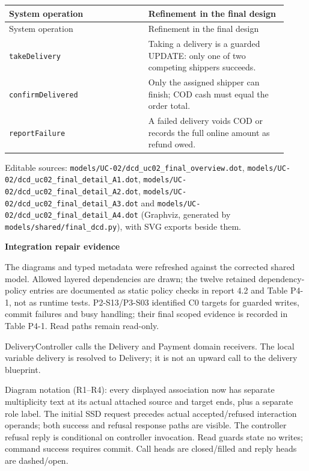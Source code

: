 \begin{longtable}{>{\raggedright\arraybackslash}p{0.4600\linewidth}>{\raggedright\arraybackslash}p{0.4600\linewidth}}
System operation & Refinement in the final design \\
\hline\endfirsthead
System operation & Refinement in the final design \\
\hline\endhead
\texttt{takeDelivery} & Taking a delivery is a guarded UPDATE: only one of two competing shippers succeeds. \\
\texttt{confirmDelivered} & Only the assigned shipper can finish; COD cash must equal the order total. \\
\texttt{reportFailure} & A failed delivery voids COD or records the full online amount as refund owed. \\
\end{longtable}
Editable sources: \texttt{models/\allowbreak{}UC-02/\allowbreak{}dcd\_\allowbreak{}uc02\_\allowbreak{}final\_\allowbreak{}overview.\allowbreak{}dot}, \texttt{models/\allowbreak{}UC-02/\allowbreak{}dcd\_\allowbreak{}uc02\_\allowbreak{}final\_\allowbreak{}detail\_\allowbreak{}A1.\allowbreak{}dot}, \texttt{models/\allowbreak{}UC-02/\allowbreak{}dcd\_\allowbreak{}uc02\_\allowbreak{}final\_\allowbreak{}detail\_\allowbreak{}A2.\allowbreak{}dot}, \texttt{models/\allowbreak{}UC-02/\allowbreak{}dcd\_\allowbreak{}uc02\_\allowbreak{}final\_\allowbreak{}detail\_\allowbreak{}A3.\allowbreak{}dot} and \texttt{models/\allowbreak{}UC-02/\allowbreak{}dcd\_\allowbreak{}uc02\_\allowbreak{}final\_\allowbreak{}detail\_\allowbreak{}A4.\allowbreak{}dot} (Graphviz, generated by \texttt{models/\allowbreak{}shared/\allowbreak{}final\_\allowbreak{}dcd.\allowbreak{}py}), with SVG exports beside them.

\textbf{Integration repair evidence}

The diagrams and typed metadata were refreshed against the corrected shared model. Allowed layered dependencies are drawn; the twelve retained dependency-policy entries are documented as static policy checks in report 4.2 and Table P4-1, not as runtime tests. P2-S13/P3-S03 identified C0 targets for guarded writes, commit failures and busy handling; their final scoped evidence is recorded in Table P4-1. Read paths remain read-only.

DeliveryController calls the Delivery and Payment domain receivers. The local variable delivery is resolved to Delivery; it is not an upward call to the delivery blueprint.

Diagram notation (R1--R4): every displayed association now has separate multiplicity text at its actual attached source and target ends, plus a separate role label. The initial SSD request precedes actual accepted/refused interaction operands; both success and refusal response paths are visible. The controller refusal reply is conditional on controller invocation. Read guards state no writes; command success requires commit. Call heads are closed/filled and reply heads are dashed/open.
